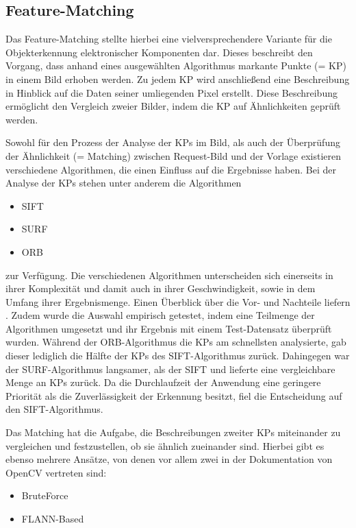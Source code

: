 \documentclass[
    type=Prakikumsbericht,
    status=draft, %
    language=german, %
    bibengine=bibtex,
]{unibwm-inf-thesis}
\begin{document}
    \subsection{Feature-Matching}
    Das Feature-Matching stellte hierbei eine vielversprechendere Variante für die Objekterkennung elektronischer Komponenten dar.
    Dieses beschreibt den Vorgang, dass anhand eines ausgewählten Algorithmus markante Punkte (= \ac{KP}) in einem Bild erhoben werden.
    Zu jedem \ac{KP} wird anschließend eine Beschreibung in Hinblick auf die Daten seiner umliegenden Pixel erstellt.
    Diese Beschreibung ermöglicht den Vergleich zweier Bilder, indem die \ac{KP} auf Ähnlichkeiten geprüft werden.\cite{CV2FeatureMathing2022}

    Sowohl für den Prozess der Analyse der \acp{KP} im Bild, als auch der Überprüfung der Ähnlichkeit (= Matching) zwischen Request-Bild und der Vorlage
    existieren verschiedene Algorithmen, die einen Einfluss auf die Ergebnisse haben.
    Bei der Analyse der \acp{KP} stehen unter anderem die Algorithmen
    \begin{itemize}
        \item \ac{SIFT}
        \item \ac{SURF}
        \item \ac{ORB}
    \end{itemize}
    zur Verfügung.
    Die verschiedenen Algorithmen unterscheiden sich einerseits in ihrer Komplexität und damit auch in ihrer Geschwindigkeit, sowie in dem Umfang ihrer Ergebnismenge.
    Einen Überblick über die Vor- und Nachteile liefern \citet{Karami2017}.
    Zudem wurde die Auswahl empirisch getestet, indem eine Teilmenge der Algorithmen umgesetzt und ihr Ergebnis mit einem Test-Datensatz überprüft wurden.
    Während der \ac{ORB}-Algorithmus die \acp{KP} am schnellsten analysierte, gab dieser lediglich die Hälfte der \acp{KP} des \ac{SIFT}-Algorithmus zurück.
    Dahingegen war der \ac{SURF}-Algorithmus langsamer, als der \ac{SIFT} und lieferte eine vergleichbare Menge an \acp{KP} zurück.
    Da die Durchlaufzeit der Anwendung eine geringere Priorität als die Zuverlässigkeit der Erkennung besitzt, fiel die Entscheidung auf den \ac{SIFT}-Algorithmus.

    Das Matching hat die Aufgabe, die Beschreibungen zweiter \acp{KP} miteinander zu vergleichen und festzustellen, ob sie ähnlich zueinander sind.
    Hierbei gibt es ebenso mehrere Ansätze, von denen vor allem zwei in der Dokumentation von OpenCV vertreten sind:
    \begin{itemize}
        \item BruteForce
        \item \ac{FLANN}-Based
    \end{itemize}
\end{document}
